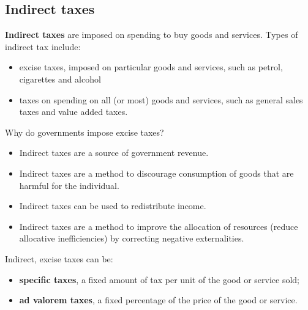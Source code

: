\documentclass[a4paper,12pt]{article}
\newcommand{\needbold}[1]{\textcolor{red!70!black}{\textbf{#1}}}
\begin{document}
\subsection{Indirect taxes}
\needbold{Indirect taxes} are imposed on spending to buy goods and services. Types of indirect tax include:
\begin{itemize}
  \item excise taxes, imposed on particular goods and services, such as petrol, cigarettes and alcohol
  \item taxes on spending on all (or most) goods and services, such as general sales taxes and value added taxes.
\end{itemize}
Why do governments impose excise taxes?
\begin{itemize}
  \item Indirect taxes are a source of government revenue.
  \item Indirect taxes are a method to discourage consumption of goods that are harmful for the individual.
  \item Indirect taxes can be used to redistribute income.
  \item Indirect taxes are a method to improve the allocation of resources (reduce allocative inefficiencies) by correcting negative externalities.
\end{itemize}
Indirect, excise taxes can be:
\begin{itemize}
  \item \needbold{specific taxes}, a fixed amount of tax per unit of the good or service sold;
  \item \needbold{ad valorem taxes}, a fixed percentage of the price of the good or service.
\end{itemize}
\end{document}
